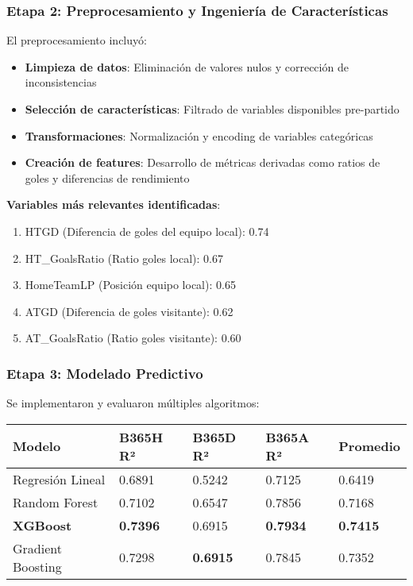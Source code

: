 \documentclass{article}
\begin{document}
\subsubsection{Etapa 2: Preprocesamiento y Ingeniería de Características}

El preprocesamiento incluyó:
\begin{itemize}
    \item \textbf{Limpieza de datos}: Eliminación de valores nulos y corrección de inconsistencias
    \item \textbf{Selección de características}: Filtrado de variables disponibles pre-partido
    \item \textbf{Transformaciones}: Normalización y encoding de variables categóricas
    \item \textbf{Creación de features}: Desarrollo de métricas derivadas como ratios de goles y diferencias de rendimiento
\end{itemize}

\textbf{Variables más relevantes identificadas}:
\begin{enumerate}
    \item HTGD (Diferencia de goles del equipo local): 0.74
    \item HT\_GoalsRatio (Ratio goles local): 0.67
    \item HomeTeamLP (Posición equipo local): 0.65
    \item ATGD (Diferencia de goles visitante): 0.62
    \item AT\_GoalsRatio (Ratio goles visitante): 0.60
\end{enumerate}

\subsubsection{Etapa 3: Modelado Predictivo}

Se implementaron y evaluaron múltiples algoritmos:

\begin{longtable}{|p{3cm}|p{2.5cm}|p{2.5cm}|p{2.5cm}|p{2.5cm}|}
\hline
\textbf{Modelo} & \textbf{B365H R²} & \textbf{B365D R²} & \textbf{B365A R²} & \textbf{Promedio} \\
\hline
\endhead
Regresión Lineal & 0.6891 & 0.5242 & 0.7125 & 0.6419 \\
\hline
Random Forest & 0.7102 & 0.6547 & 0.7856 & 0.7168 \\
\hline
\textcolor{primary}{\textbf{XGBoost}} & \textcolor{primary}{\textbf{0.7396}} & 0.6915 & \textcolor{primary}{\textbf{0.7934}} & \textcolor{primary}{\textbf{0.7415}} \\
\hline
Gradient Boosting & 0.7298 & \textcolor{primary}{\textbf{0.6915}} & 0.7845 & 0.7352 \\
\hline
\end{longtable}
\end{document}
